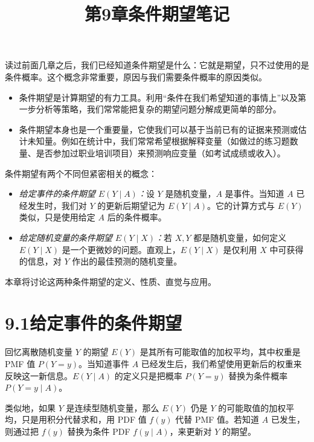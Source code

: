 \documentclass[UTF8,12pt,a4paper,fontset=fandol]{ctexart}
\title{第9章\quad 条件期望笔记}
\author{}
\date{}
\begin{document}
\maketitle

读过前面几章之后，我们已经知道条件期望是什么：它就是期望，只不过使用的是条件概率。这个概念非常重要，原因与我们需要条件概率的原因类似。

\begin{itemize}
  \item 条件期望是计算期望的有力工具。利用“条件在我们希望知道的事情上”以及第一步分析等策略，我们常常能把复杂的期望问题分解成更简单的部分。

  \item 条件期望本身也是一个重要量，它使我们可以基于当前已有的证据来预测或估计未知量。例如在统计中，我们常常希望根据解释变量（如做过的练习题数量、是否参加过职业培训项目）来预测响应变量（如考试成绩或收入）。
\end{itemize}

条件期望有两个不同但紧密相关的概念：

\begin{itemize}
  \item \textit{给定事件的条件期望 $E(Y\mid A)$：}设 $Y$ 是随机变量，$A$ 是事件。当知道 $A$ 已经发生时，我们对 $Y$ 的更新后期望记为 $E(Y\mid A)$。它的计算方式与 $E(Y)$ 类似，只是使用给定 $A$ 后的条件概率。

  \item \textit{给定随机变量的条件期望 $E(Y\mid X)$：}若 $X,Y$ 都是随机变量，如何定义 $E(Y\mid X)$ 是一个更微妙的问题。直观上，$E(Y\mid X)$ 是仅利用 $X$ 中可获得的信息，对 $Y$ 作出的最佳预测的随机变量。
\end{itemize}

本章将讨论这两种条件期望的定义、性质、直觉与应用。

\section*{9.1\quad 给定事件的条件期望}

回忆离散随机变量 $Y$ 的期望 $E(Y)$ 是其所有可能取值的加权平均，其中权重是 PMF 值 $P(Y=y)$。当知道事件 $A$ 已经发生后，我们希望使用更新后的权重来反映这一新信息。$E(Y\mid A)$ 的定义只是把概率 $P(Y=y)$ 替换为条件概率 $P(Y=y\mid A)$。

类似地，如果 $Y$ 是连续型随机变量，那么 $E(Y)$ 仍是 $Y$ 的可能取值的加权平均，只是用积分代替求和，用 PDF 值 $f(y)$ 代替 PMF 值。若知道 $A$ 已发生，则通过把 $f(y)$ 替换为条件 PDF $f(y\mid A)$，来更新对 $Y$ 的期望。
\end{document}
